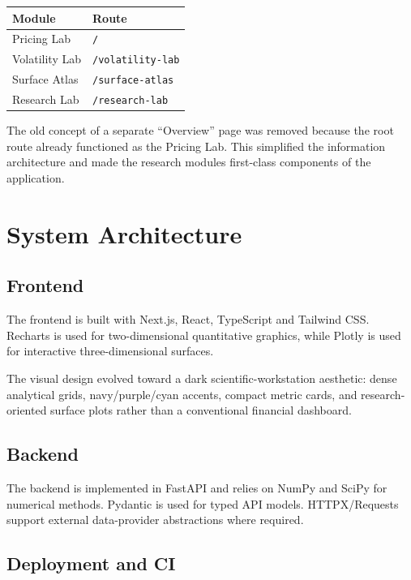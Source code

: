 \documentclass[11pt,a4paper]{article}
\begin{document}
\begin{center}
\begin{tabular}{ll}
\toprule
Module & Route \\
\midrule
Pricing Lab & \texttt{/} \\
Volatility Lab & \texttt{/volatility-lab} \\
Surface Atlas & \texttt{/surface-atlas} \\
Research Lab & \texttt{/research-lab} \\
\bottomrule
\end{tabular}
\end{center}

The old concept of a separate ``Overview'' page was removed because the root route already functioned as the Pricing Lab. This simplified the information architecture and made the research modules first-class components of the application.

\section{System Architecture}

\subsection{Frontend}

The frontend is built with Next.js, React, TypeScript and Tailwind CSS. Recharts is used for two-dimensional quantitative graphics, while Plotly is used for interactive three-dimensional surfaces.

The visual design evolved toward a dark scientific-workstation aesthetic: dense analytical grids, navy/purple/cyan accents, compact metric cards, and research-oriented surface plots rather than a conventional financial dashboard.

\subsection{Backend}

The backend is implemented in FastAPI and relies on NumPy and SciPy for numerical methods. Pydantic is used for typed API models. HTTPX/Requests support external data-provider abstractions where required.

\subsection{Deployment and CI}
\end{document}
